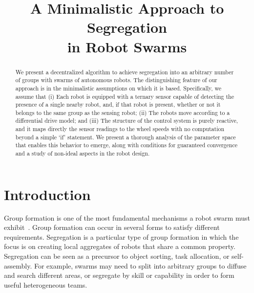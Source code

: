 \documentclass[conference]{IEEEtran}
\begin{document}
\title{A Minimalistic Approach to Segregation\\
  in Robot Swarms}

\author{
}

\maketitle

\begin{abstract}
  We present a decentralized algorithm to achieve segregation into an arbitrary
  number of groups with swarms of autonomous robots. The distinguishing feature
  of our approach is in the minimalistic assumptions on which it is
  based. Specifically, we assume that (i) Each robot is equipped with a ternary
  sensor capable of detecting the presence of a single nearby robot, and, if
  that robot is present, whether or not it belongs to the same group as the
  sensing robot; (ii) The robots move according to a differential drive model;
  and (iii) The structure of the control system is purely reactive, and it maps
  directly the sensor readings to the wheel speeds with no computation beyond a
  simple `if' statement. We present a thorough analysis of the parameter space
  that enables this behavior to emerge, along with conditions for guaranteed
  convergence and a study of non-ideal aspects in the robot design.
\end{abstract}


\section{Introduction}

Group formation is one of the most fundamental mechanisms a robot swarm must
exhibit~\cite{Brambilla2013}. Group formation can occur in several forms to
satisfy different requirements. Segregation is a particular type of group
formation in which the focus is on creating local aggregates of robots that
share a common property. Segregation can be seen as a precursor to object
sorting, task allocation, or self-assembly. For example, swarms may need to
split into arbitrary groups to diffuse and search different areas, or segregate
by skill or capability in order to form useful heterogeneous teams.
\end{document}
